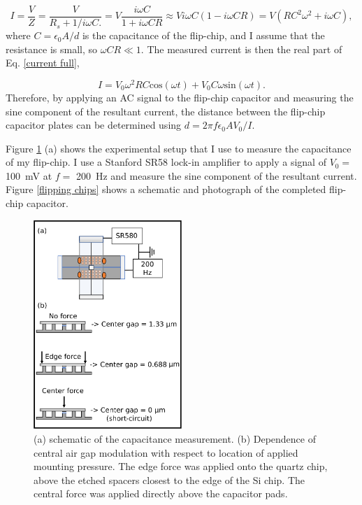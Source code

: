 \documentclass[double,12pt,1in]{beavtex}
\begin{document}
\begin{equation} \label{current full}
    I = \frac{V}{Z} = \frac{V}{R_s + 1/i\omega C.} = V \frac{i\omega C}{1 + i\omega C R}\approx V i\omega C (1 - i\omega C R) = V(R C^2 \omega ^2 + i\omega C),
\end{equation}
where $C = \epsilon_0 A / d$ is the capacitance of the flip-chip, and I assume that the resistance is small, so $\omega C R \ll 1$. The measured current is then the real part of Eq. \ref{current full}, 

\begin{equation}
    I = V_0\omega^2 R C \mathrm{cos}(\omega t) + V_0 C \omega \mathrm{sin}(\omega t).
\end{equation}
Therefore, by applying an AC signal to the flip-chip capacitor and measuring the sine component of the resultant current, the distance between the flip-chip capacitor plates can be determined using $d = 2\pi f \epsilon_0 A V_0 / I$.

Figure \ref{FC cap measurement} (a) shows the experimental setup that I use to measure the capacitance of my flip-chip. I use a Stanford SR58 lock-in amplifier to apply a signal of $V_0 = $ \SI{100}{\milli\volt} at $f = $ \SI{200}{\hertz} and measure the sine component of the resultant current. Figure \ref{flipping chips} shows a schematic and photograph of the completed flip-chip capacitor.

\begin{figure}
    \includegraphics[width = 0.5\textwidth]{FC capacitance measurement.pdf}
    \caption{(a) schematic of the capacitance measurement. (b) Dependence of central air gap modulation with respect to location of applied mounting pressure. The edge force was applied onto the quartz chip, above the etched spacers closest to the edge of the Si chip. The central force was applied directly above the capacitor pads.}
    \label{FC cap measurement}
\end{figure}
\end{document}

